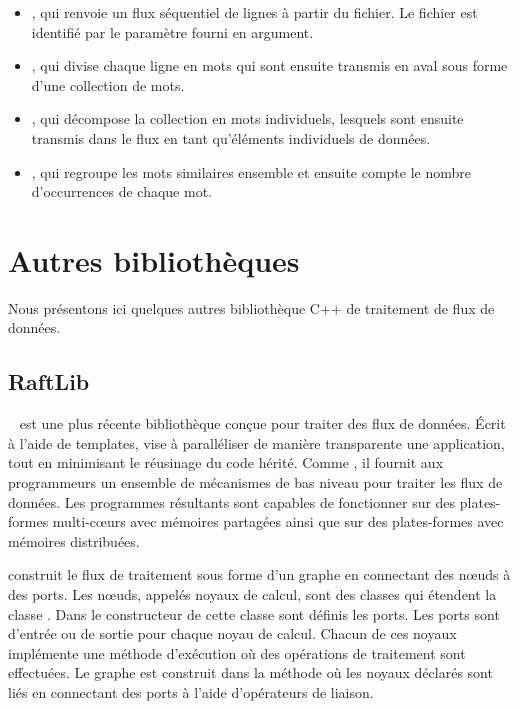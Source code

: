 \begin{itemize}
    \item {}, qui renvoie un flux s\'equentiel de lignes \`a partir du fichier. Le fichier est identifi\'e par le param\`etre  fourni en argument.

    \item {}, qui divise chaque ligne en mots qui sont ensuite transmis en aval sous forme d'une collection de mots.
    
    \item {}, qui décompose la collection en mots individuels, lesquels sont ensuite transmis dans le flux en tant qu'éléments individuels de données.
    
    \item {}, qui regroupe les mots similaires ensemble et ensuite compte le nombre d'occurrences de chaque mot.
    
\end{itemize}

\section{Autres biblioth\`eques }

Nous présentons ici quelques autres bibliothèque C++ de traitement de flux de données.


\subsection{RaftLib} 
\label{raftlib.sect}

~\citep{beard2017raftlib} est une plus r\'ecente biblioth\`eque  con\c{c}ue pour traiter des flux de donn\'ees. \'Ecrit \`a l'aide de templates,  vise \`a parall\'eliser de mani\`ere transparente une application, tout en minimisant le réusinage du code h\'erit\'e. Comme , il fournit aux programmeurs un ensemble de m\'ecanismes de bas niveau pour traiter les flux de donn\'ees. Les programmes r\'esultants sont capables de fonctionner sur des plates-formes multi-cœurs avec m\'emoires partag\'ees ainsi que sur des plates-formes avec m\'emoires distribu\'ees.



 construit le flux de traitement sous forme d'un graphe en connectant des nœuds à des ports. Les nœuds, appel\'es noyaux de calcul, sont des classes  qui \'etendent la classe . Dans le constructeur de cette classe sont d\'efinis les ports. Les ports sont d'entrée ou de sortie pour chaque noyau de calcul. Chacun de ces noyaux impl\'emente une m\'ethode d'ex\'ecution o\`u des op\'erations de traitement sont effectu\'ees. Le graphe est construit dans la m\'ethode  o\`u les noyaux d\'eclar\'es sont li\'es en connectant des ports \`a l'aide d'op\'erateurs de liaison. 


